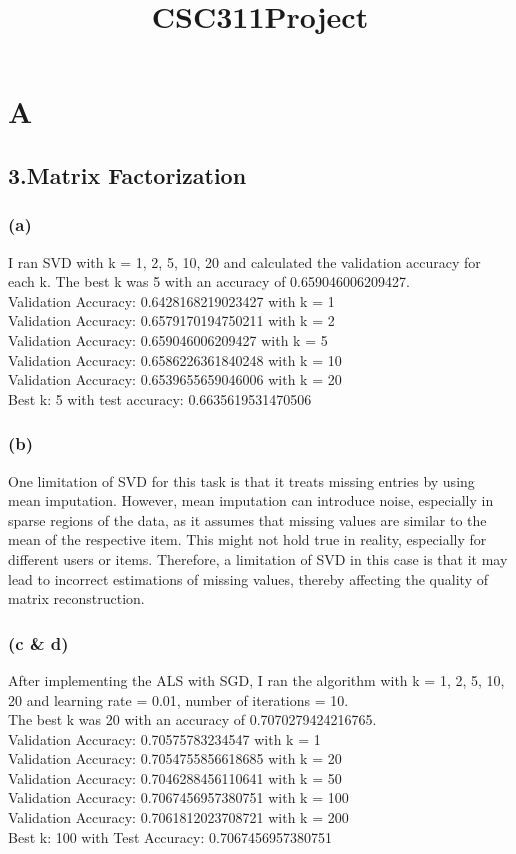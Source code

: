 \documentclass{article}
\title{CSC311Project}
\begin{document}
\maketitle



\section*{A}
\subsection*{3.Matrix Factorization}
\subsubsection*{(a)}
I ran SVD with k = 1, 2, 5, 10, 20 and calculated the validation accuracy for each k. The best k was 5 with an accuracy of 0.659046006209427.\\
Validation Accuracy: 0.6428168219023427 with k = 1\\
Validation Accuracy: 0.6579170194750211 with k = 2\\
Validation Accuracy: 0.659046006209427 with k = 5\\
Validation Accuracy: 0.6586226361840248 with k = 10\\
Validation Accuracy: 0.6539655659046006 with k = 20\\
Best k: 5 with test accuracy: 0.6635619531470506\\

\subsubsection*{(b)}
One limitation of SVD for this task is that it treats missing entries by using mean imputation. However,
mean imputation can introduce noise, especially in sparse regions of the data, as it assumes that missing values are similar
to the mean of the respective item. This might not hold true in reality, especially for different users or items. Therefore,
a limitation of SVD in this case is that it may lead to incorrect estimations of missing values, thereby affecting the quality
of matrix reconstruction.


\subsubsection*{(c & d)}
After implementing the ALS with SGD, I ran the algorithm with k = 1, 2, 5, 10, 20 and learning rate = 0.01, number of iterations = 10.\\
The best k was 20 with an accuracy of 0.7070279424216765.\\
Validation Accuracy: 0.70575783234547 with k = 1\\
Validation Accuracy: 0.7054755856618685 with k = 20\\
Validation Accuracy: 0.7046288456110641 with k = 50\\
Validation Accuracy: 0.7067456957380751 with k = 100\\
Validation Accuracy: 0.7061812023708721 with k = 200\\
Best k: 100 with Test Accuracy: 0.7067456957380751\\
\end{document}
